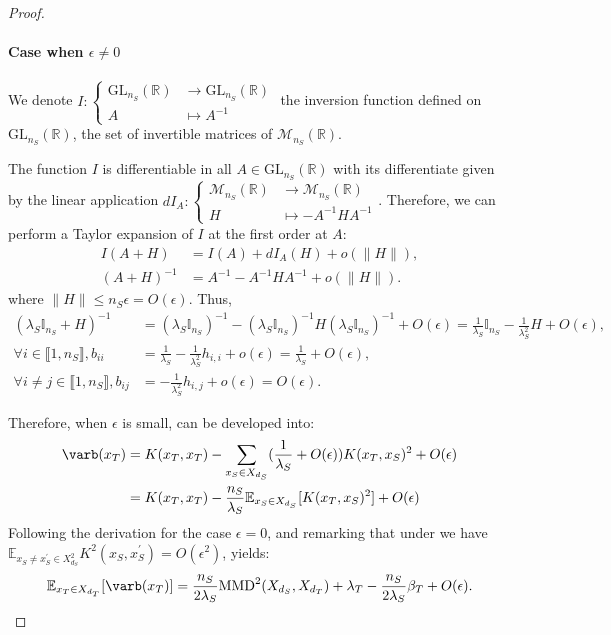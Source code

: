 \begin{proof}
\paragraph{Case when $\epsilon\neq 0$}
We denote
$I:\left\{\begin{array}{cl}\mathrm{GL}_{n_S}(\mathbb{R}) & \rightarrow \mathrm{GL}_{n_S}(\mathbb{R}) \\ A & \mapsto A^{-1}\end{array}\right.$
the inversion function defined on $\mathrm{GL}_{n_S}(\mathbb{R})$, the set of invertible matrices of $\mathcal{M}_{n_S}(\mathbb{R})$.

The function $I$ is differentiable \cite{magnus2019matrix} in all $A\in \mathrm{GL}_{n_S}(\mathbb{R})$ with its differentiate given by the linear application
$dI_A:\left\{\begin{array}{cl}\mathcal{M}_{n_S}(\mathbb{R})&\rightarrow \mathcal{M}_{n_S}(\mathbb{R}) \\ H &\mapsto - A^{-1}HA^{-1}\end{array}\right.$. Therefore, we can perform a Taylor expansion of $I$ at the first order at $A$:
\begin{align*}
    I(A+H)&=I(A)+dI_A(H)+o(\|H\|), \\
    (A+H)^{-1}&=A^{-1}-A^{-1}HA^{-1}+o(\|H\|).
\end{align*}
where $\|H\|\leq n_S\epsilon=O(\epsilon)$. Thus,
\begin{align*}
    (\lambda_S\mathbb{I}_{n_S}+H)^{-1}&=(\lambda_S\mathbb{I}_{n_S})^{-1}-(\lambda_S\mathbb{I}_{n_S})^{-1}H(\lambda_S\mathbb{I}_{n_S})^{-1}+O(\epsilon) =\frac{1}{\lambda_S}\mathbb{I}_{n_S}-\frac{1}{\lambda_S^2}H+O(\epsilon), \\
    \forall i \in \llbracket1, n_S\rrbracket, b_{ii}&=\frac{1}{\lambda_S}-\frac{1}{\lambda_S^2}h_{i,i}+o(\epsilon)=\frac{1}{\lambda_S}+O(\epsilon), \\
    \forall i \neq j \in \llbracket1, n_S\rrbracket, b_{ij}&=-\frac{1}{\lambda_S^2}h_{i,j}+o(\epsilon)=O(\epsilon).
\end{align*}

Therefore, when $\epsilon$ is small,  can be developed into:
\begin{align*}
    \varb(x_T)&=K(x_T, x_T)-\sum_{x_S\in X_{d_S}} (\frac{1}{\lambda_S}+O(\epsilon)) K(x_T, x_S)^2 + O(\epsilon) \\
    &= K(x_T,x_T)- \frac{n_S}{\lambda_S} \mathbb{E}_{x_S\in X_{d_S}}[K(x_T, x_S)^2] + O(\epsilon)
\end{align*}
Following the derivation for the case $\epsilon=0$, and remarking that under  we have $\mathbb{E}_{x_S \neq x_S^\prime \in X_{d_S}^2} K^2\left(x_S, x_S^{\prime}\right)=O(\epsilon^2)$, yields:
\begin{equation*}
    \mathbb{E}_{x_T\in X_{d_T}}[\varb(x_T)] = \frac{n_S}{2\lambda_S}\text{MMD}^{2}(X_{d_S}, X_{d_T}) + \lambda_T - \frac{n_S}{2\lambda_S}\beta_T+ O(\epsilon).
\end{equation*}


\end{proof}
